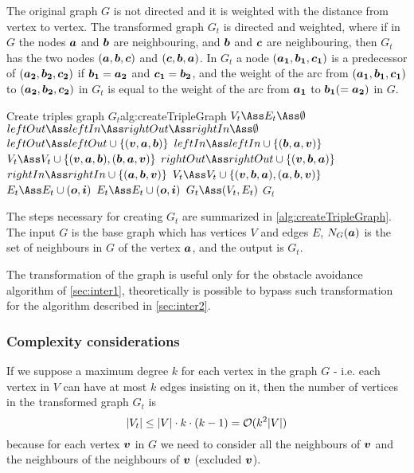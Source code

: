 \documentclass[dissertation.tex]{subfiles}
\begin{document}
The original graph $G$ is not directed and it is weighted
with the distance from vertex to vertex. The transformed graph $G_t$ is
directed and weighted, where if in $G$ the nodes $\boldsymbol{a}$
and $\boldsymbol{b}$ are
neighbouring, and $\boldsymbol{b}$ and $\boldsymbol{c}$ are neighbouring, then $G_t$
has the two nodes $(\boldsymbol{a},\boldsymbol{b},\boldsymbol{c})$ and $(\boldsymbol{c},\boldsymbol{b},\boldsymbol{a})$. In
$G_t$ a node $(\boldsymbol{a_1},\boldsymbol{b_1},\boldsymbol{c_1})$ is a predecessor of
$(\boldsymbol{a_2},\boldsymbol{b_2},\boldsymbol{c_2})$ if $\boldsymbol{b_1}=\boldsymbol{a_2}$ and $\boldsymbol{c_1}=\boldsymbol{b_2}$, and the weight of the arc
from $(\boldsymbol{a_1},\boldsymbol{b_1},\boldsymbol{c_1})$ to $(\boldsymbol{a_2},\boldsymbol{b_2},\boldsymbol{c_2})$ in $G_t$ is
equal to
the weight of the arc from $\boldsymbol{a_1}$ to $\boldsymbol{b_1}(=\boldsymbol{a_2})$ in $G$.

\begin{algo}{Create triples graph $G_t$}{alg:createTripleGraph}
  \State $V_t\Ass E_t\Ass \emptyset$
  \label{ln:tripleFor0}
  \State $leftOut\Ass leftIn\Ass rightOut\Ass rightIn\Ass \emptyset$
  \State $leftOut \Ass leftOut\cup \{(\ve{v},\ve{a},\ve{b})\}$
  \State $leftIn \Ass leftIn\cup \{(\ve{b},\ve{a},\ve{v})\}$
  \State $V_t \Ass V_t\cup \{(\ve{v},\ve{a},\ve{b}), (\ve{b},\ve{a},\ve{v})\}$
  \EndFor
  \State $rightOut \Ass rightOut\cup \{(\ve{v},\ve{b},\ve{a})\}$
  \State $rightIn \Ass rightIn\cup \{(\ve{a},\ve{b},\ve{v})\}$
  \State $V_t \Ass V_t\cup \{(\ve{v},\ve{b},\ve{a}), (\ve{a},\ve{b},\ve{v})\}$
  \EndFor
  \State $E_t \Ass E_t\cup (\ve{o},\ve{i})$
  \EndFor
  \EndFor
  \label{ln:tripleFor1}
  \label{ln:tripleFor2}
  \State $E_t \Ass E_t\cup (\ve{o},\ve{i})$
  \EndFor
  \EndFor
  \EndFor
  \State $G_t\Ass(V_t,E_t)$
  \State\Return $G_t$
  \EndFunction
\end{algo}
The steps necessary for creating $G_t$ are summarized in
\cref{alg:createTripleGraph}. The input $G$ is the base graph
which has vertices $V$ and edges $E$, $N_G(\boldsymbol{a})$ is the set of
neighbours in $G$ of the vertex $\boldsymbol{a}$, and the output is $G_t$.

The transformation of the graph is useful only for the obstacle
avoidance algorithm of
\cref{sec:inter1}, theoretically is possible to bypass such
transformation for the algorithm described in \cref{sec:inter2}.

\subsubsection{Complexity considerations}
If we suppose a maximum degree $k$ for each vertex in the graph $G$ -
i.e. each vertex in $V$ can have at most $k$ edges insisting on
it, then the number of vertices in the transformed graph $G_t$ is 
\begin{equation}
  \label{eq:numTriples}
  |V_t|\leq |V|\cdot k\cdot(k-1)=\mathcal{O}(k^2|V|)
\end{equation}
because for each vertex $\boldsymbol{v}$ in $G$ we need to
consider all the neighbours of $\boldsymbol{v}$ and the neighbours of the neighbours
of $\boldsymbol{v}$ (excluded $\boldsymbol{v}$).
\end{document}
